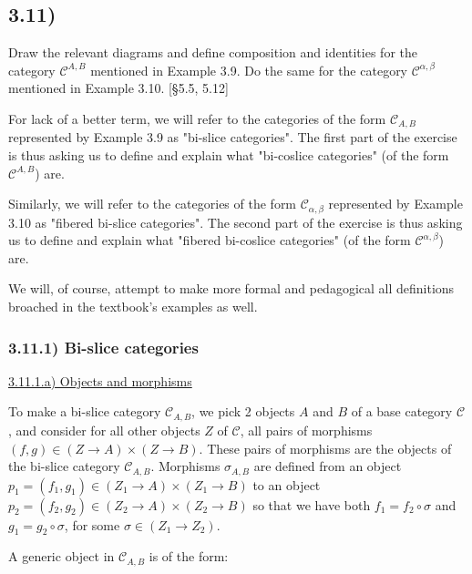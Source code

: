 \documentclass[12pt, letterpaper, twoside]{report}
\begin{document}
\subsection*{3.11)}

Draw the relevant diagrams and define composition and identities for the category $\mathcal{C}^{A,B}$ mentioned in Example 3.9. Do the same for the category $\mathcal{C}^{\alpha, \beta}$ mentioned in Example 3.10. [§5.5, 5.12]

For lack of a better term, we will refer to the categories of the form $\mathcal{C}_{A,B}$ represented by Example 3.9 as "bi-slice categories". The first part of the exercise is thus asking us to define and explain what "bi-coslice categories" (of the form $\mathcal{C}^{A,B}$) are.

Similarly, we will refer to the categories of the form $\mathcal{C}_{\alpha, \beta}$ represented by Example 3.10 as "fibered bi-slice categories". The second part of the exercise is thus asking us to define and explain what "fibered bi-coslice categories" (of the form $\mathcal{C}^{\alpha, \beta}$) are.

We will, of course, attempt to make more formal and pedagogical all definitions broached in the textbook's examples as well.


\subsubsection*{3.11.1) Bi-slice categories}

\vspace{5mm}
\underline{3.11.1.a) Objects and morphisms}

To make a bi-slice category $\mathcal{C}_{A,B}$, we pick 2 objects $A$ and $B$ of a base category $\mathcal{C}$, and consider for all other objects $Z$ of $\mathcal{C}$, all pairs of morphisms $(f, g) \in (Z \to A) \times (Z \to B)$. These pairs of morphisms are the objects of the bi-slice category $\mathcal{C}_{A,B}$. Morphisms $\sigma_{A,B}$ are defined from an object $p_1 = (f_1, g_1) \in (Z_1 \to A) \times (Z_1 \to B)$ to an object $p_2 = (f_2, g_2) \in (Z_2 \to A) \times (Z_2 \to B)$ so that we have both $f_1 = f_2 \circ \sigma$ and $g_1 = g_2 \circ \sigma$, for some $\sigma \in (Z_1 \to Z_2)$.

A generic object in $\mathcal{C}_{A,B}$ is of the form:

\end{document}
